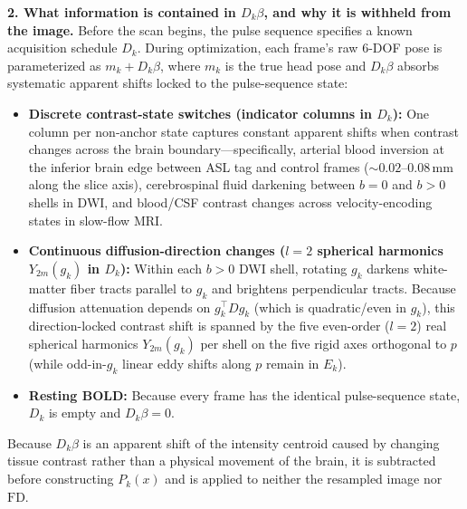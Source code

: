 \documentclass[11pt]{article}
\begin{document}
\textbf{2. What information is contained in $D_k\beta$, and why it is withheld from the image.}
Before the scan begins, the pulse sequence specifies a known acquisition schedule $D_k$. During optimization, each frame's raw 6-DOF pose is parameterized as $m_k + D_k\beta$, where $m_k$ is the true head pose and $D_k\beta$ absorbs systematic apparent shifts locked to the pulse-sequence state:
\begin{itemize}
\item \textbf{Discrete contrast-state switches (indicator columns in $D_k$):} One column per non-anchor state captures constant apparent shifts when contrast changes across the brain boundary—specifically, arterial blood inversion at the inferior brain edge between ASL tag and control frames ($\sim 0.02\text{--}0.08$\,mm along the slice axis), cerebrospinal fluid darkening between $b = 0$ and $b > 0$ shells in DWI, and blood/CSF contrast changes across velocity-encoding states in slow-flow MRI.
\item \textbf{Continuous diffusion-direction changes ($l = 2$ spherical harmonics $Y_{2m}(g_k)$ in $D_k$):} Within each $b > 0$ DWI shell, rotating $g_k$ darkens white-matter fiber tracts parallel to $g_k$ and brightens perpendicular tracts. Because diffusion attenuation depends on $g_k^\top D g_k$ (which is quadratic/even in $g_k$), this direction-locked contrast shift is spanned by the five even-order ($l = 2$) real spherical harmonics $Y_{2m}(g_k)$ per shell on the five rigid axes orthogonal to $p$ (while odd-in-$g_k$ linear eddy shifts along $p$ remain in $E_k$).
\item \textbf{Resting BOLD:} Because every frame has the identical pulse-sequence state, $D_k$ is empty and $D_k\beta = 0$.
\end{itemize}
Because $D_k\beta$ is an apparent shift of the intensity centroid caused by changing tissue contrast rather than a physical movement of the brain, it is subtracted before constructing $P_k(x)$ and is applied to neither the resampled image nor $\text{FD}$.
\end{document}
